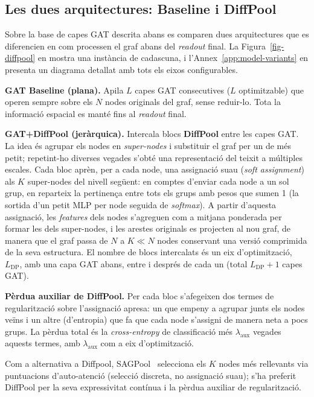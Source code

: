 \documentclass[10pt,a4paper,twocolumn,twoside]{article}
\begin{document}
\subsection{Les dues arquitectures: Baseline i DiffPool}
\label{sec:architectures}

Sobre la base de capes GAT descrita abans es comparen dues arquitectures que es diferencien en
com processen el graf abans del \textit{readout} final. La Figura~\ref{fig-diffpool} en
mostra una instància de cadascuna, i l'Annex~\ref{app:model-variants} en presenta un diagrama
detallat amb tots els eixos configurables.

\textbf{GAT Baseline (plana).} Apila $L$ capes GAT consecutives ($L$ optimitzable)
que operen sempre sobre els $N$ nodes originals del graf, sense reduir-lo. Tota la
informació espacial es manté fins al \textit{readout} final.

\textbf{GAT+DiffPool (jeràrquica).} Intercala blocs \textbf{DiffPool}
\cite{ying2019hierarchicalgraphrepresentationlearning} entre les capes GAT. La idea és
agrupar els nodes en \textit{super-nodes} i substituir el graf per un de més petit; repetint-ho
diverses vegades s'obté una representació del teixit a múltiples escales. Cada bloc aprèn, per a cada
node, una assignació suau (\textit{soft assignment}) als $K$ super-nodes del nivell següent:
en comptes d'enviar cada node a un sol grup, en reparteix la pertinença entre tots els grups amb pesos
que sumen 1 (la sortida d'un petit MLP per node seguida de \textit{softmax}). A partir d'aquesta
assignació, les \textit{features} dels nodes s'agreguen com a mitjana ponderada per formar les dels
super-nodes, i les arestes originals es projecten al nou graf, de manera que el graf passa de $N$ a
$K \ll N$ nodes conservant una versió comprimida de la seva estructura. El nombre de blocs intercalats
és un eix d'optimització, $L_{\text{DP}}$, amb una capa GAT abans, entre i després de
cada un (total $L_{\text{DP}}+1$ capes GAT).

\textbf{Pèrdua auxiliar de DiffPool.} Per cada bloc s'afegeixen dos termes de regularització sobre
l'assignació apresa: un que empeny a agrupar junts els nodes veïns i un altre (d'entropia) que fa que
cada node s'assigni de manera neta a pocs grups. La pèrdua total és la \textit{cross-entropy} de
classificació més $\lambda_{\text{aux}}$ vegades aquests termes, amb $\lambda_{\text{aux}}$ com a eix
d'optimització.

Com a alternativa a Diffpool, SAGPool~\cite{lee2019selfattentiongraphpooling} selecciona els $K$
nodes més rellevants via puntuacions d'auto-atenció (selecció discreta, no assignació suau); s'ha
preferit DiffPool per la seva expressivitat contínua i la pèrdua auxiliar de regularització.
\end{document}
